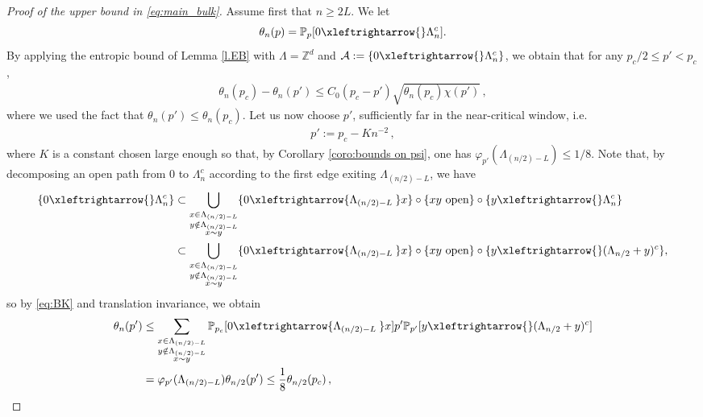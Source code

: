 \documentclass[11pt,a4paper]{article}
\numberwithin{equation}{section}
\theoremstyle{plain}
\theoremstyle{definition}
\newcommand{\connect}{\xleftrightarrow}
\newcommand{\1}{\mathbf 1}
\begin{document}
\begin{proof}[Proof of the upper bound in \eqref{eq:main_bulk}] Assume first that $n\geq 2L$.
	We let 
	\begin{equation}
	\theta_n(p)=\mathbb{P}_{p}[0\connect{}\Lambda_n^c].
	\end{equation} 
	By applying the entropic bound of Lemma \ref{l.EB} with $\Lambda=\mathbb Z^d$ and $\mathcal A:=\{0\connect{}\Lambda_n^c\}$, we obtain that for any $p_c/2\leq p'<p_c$, 
	\begin{align}\label{e.EB}
		\theta_n(p_c) - \theta_n(p') \leq C_0 (p_c-p')  \sqrt{ \theta_n(p_c)  \chi(p') }\,,
	\end{align}
	where we used the fact that $\theta_n(p') \leq \theta_n(p_c)$. 
	Let us now choose $p'$, sufficiently far in the near-critical window, i.e. 
	\begin{align*}\label{}
		p' := p_c - K n^{-2}\,,
	\end{align*}
	where $K$ is a constant chosen large enough so that, by Corollary \ref{coro:bounds on psi}, one has $\varphi_{p'}(\Lambda_{(n/2)-L})\leq 1/8$. Note that, by decomposing an open path from $0$ to $\Lambda_n^c$ according to the first edge exiting $\Lambda_{(n/2)-L}$, we have
	\begin{align}
	\begin{split}
		\{0\connect{}\Lambda_n^c\} &\subset \bigcup_{\substack{x\in  \Lambda_{(n/2)-L}\\y \notin \Lambda_{(n/2)-L}\\x \sim y}} \{0\connect{\Lambda_{(n/2)-L}\:} x\} \circ \{xy \textup{ open}\}\circ \{y\connect{}\Lambda_n^c\} \\
		&\subset \bigcup_{\substack{x\in  \Lambda_{(n/2)-L}\\y \notin \Lambda_{(n/2)-L}\\x \sim y}}\{0\connect{\Lambda_{(n/2)-L}\:} x\} \circ \{xy \textup{ open}\}\circ  \{y\connect{}(\Lambda_{n/2} + y)^c\},
	\end{split}
	\end{align}
	so by \eqref{eq:BK} and translation invariance, we obtain
	\begin{align}
	\begin{split}
		\theta_n(p') &\leq \sum_{\substack{x\in  \Lambda_{(n/2)-L}\\y \notin \Lambda_{(n/2)-L}\\x \sim y}} \mathbb{P}_{p_c}[0\connect{\Lambda_{(n/2)-L}\:} x] p' \mathbb{P}_{p'}[y\connect{}(\Lambda_{n/2}+y)^c]\\ 
		& = \varphi_{p'}(\Lambda_{(n/2)-L})  \theta_{n/2}(p') \leq \frac 1 8  \theta_{n/2}(p_c)\,,

\end{split}
\end{align}
\end{proof}
\end{document}
